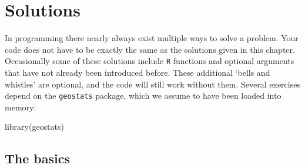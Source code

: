 \chapter{Solutions}
\label{ch:solutions}

In programming there nearly always exist multiple ways to solve a
problem. Your code does not have to be exactly the same as the
solutions given in this chapter. Occasionally some of these solutions
include \texttt{R} functions and optional arguments that have not
already been introduced before. These additional `bells and whistles'
are optional, and the code will still work without them. Several
exercises depend on the \texttt{geostats} package, which we assume to
have been loaded into memory:

\begin{console}
library(geostats)
\end{console}
  
\section{The basics}
\label{sec:sol-basics}

